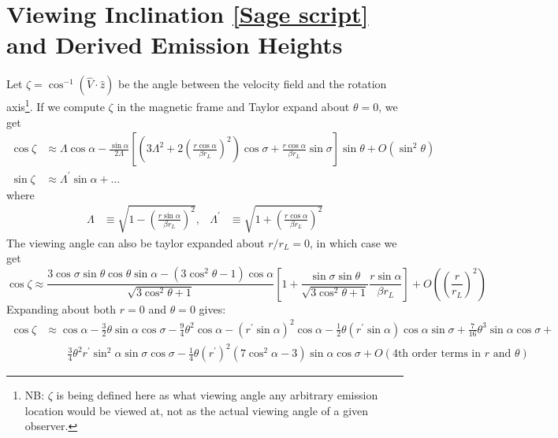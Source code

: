 \documentclass{book}
\newcommand{\linktosage}[1]{\hyperref[#1]{[Sage script]}}
\begin{document}
\section{Viewing Inclination \linktosage{sage:zeta} and Derived Emission Heights}
\label{sec:zeta}

Let $\zeta = \cos^{-1}(\hat{V}\cdot\hat{z})$ be the angle between the velocity field and the rotation axis\footnote{NB: $\zeta$ is being defined here as what viewing angle any arbitrary emission location would be viewed at, not as the actual viewing angle of a given observer.}.
If we compute $\zeta$ in the magnetic frame and Taylor expand about $\theta = 0$, we get
\begin{equation}
    \begin{aligned}
        \cos\zeta &\approx \Lambda\cos\alpha -
            \frac{\sin\alpha}{2\Lambda}\left[\left(3\Lambda^2 + 2\left(\frac{r\cos\alpha}{\beta r_L}\right)^2\right)\cos\sigma +
                \frac{r\cos\alpha}{\beta r_L}\sin\sigma\right] \sin\theta + O(\sin^2\theta) \\
        \sin\zeta &\approx \Lambda^\prime \sin\alpha + \dots
    \end{aligned}
    \label{eqn:zeta_th}
\end{equation}
where
\begin{align}
    \Lambda &\equiv \sqrt{1-\left(\frac{r\sin\alpha}{\beta r_L}\right)^2}, &
    \Lambda^\prime &\equiv \sqrt{1+\left(\frac{r\cos\alpha}{\beta r_L}\right)^2}
\end{align}
The viewing angle can also be taylor expanded about $r/r_L = 0$, in which case we get
\begin{equation}
    \cos\zeta \approx
        \frac{3\cos\sigma\sin\theta\cos\theta\sin\alpha - (3\cos^2\theta - 1)\cos\alpha}{\sqrt{3\cos^2\theta + 1}}
        \left[1 + \frac{\sin\sigma\sin\theta}{\sqrt{3\cos^2\theta+1}} \frac{r\sin\alpha}{\beta r_L}\right] +
        O\left(\left(\frac{r}{r_L}\right)^2\right)
    \label{eqn:viewingangle_taylor}
\end{equation}
Expanding about both $r = 0$ and $\theta = 0$ gives:
\begin{equation}
    \begin{aligned}
        \cos\zeta &\approx \cos\alpha - \frac32\theta\sin\alpha\cos\sigma -
            \frac94\theta^2\cos\alpha - (r^\prime\sin\alpha)^2\cos\alpha -
            \frac12\theta(r^\prime\sin\alpha)\cos\alpha\sin\sigma +
            \frac{7}{16}\theta^3\sin\alpha\cos\sigma + \\
            &\qquad \frac34 \theta^2 r^\prime\sin^2\alpha\sin\sigma\cos\sigma -
            \frac14 \theta (r^\prime)^2(7\cos^2\alpha-3)\sin\alpha\cos\sigma +
            O(\text{4th order terms in $r$ and $\theta$})
    \end{aligned}
\end{equation}
\end{document}
